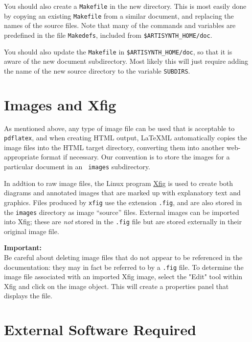 \documentclass{article}
\begin{document}
You should also create a {\tt Makefile} in the new directory. This is most
easily done by copying an existing {\tt Makefile} from a similar document,
and replacing the names of the source files. 
Note that many of the commands
and variables are predefined in the file {\tt Makedefs}, included from
{\tt \$ARTISYNTH\_HOME/doc}.

You should also update the {\tt Makefile} in {\tt \$ARTISYNTH\_HOME/doc},
so that it is aware of the new document subdirectory. Most
likely this will just require adding the name of the new source
directory to the variable {\tt SUBDIRS}.

\section{Images and Xfig}
\label{ImagesSec}

As mentioned above, any type of image file can be used that is
acceptable to {\tt pdflatex}, and when creating HTML output, LaTeXML
automatically copies the image files into the HTML target directory,
converting them into another web-appropriate format if necessary.  Our
convention is to store the images for a particular document in an {\tt
images} subdirectory.

In addtion to raw image files, the Linux program
\href{http://www.xfig.org}{Xfig} is used to create both diagrams and
annotated images that are marked up with explanatory text and
graphics.  Files produced by {\tt xfig} use the extension {\tt .fig},
and are also stored in the {\tt images} directory as image ``source''
files.  External images can be imported into Xfig; these are {\it not}
stored in the {\tt .fig} file but are stored externally in their
original image file.

\begin{sideblock}
{\bf Important:}\\ Be careful about deleting image files that do not
appear to be referenced in the documentation: they may in fact be
referred to by a {\tt .fig} file.  To determine the image file
associated with an imported Xfig image, select the "Edit" tool within
Xfig and click on the image object.  This will create a properties
panel that displays the file.
\end{sideblock}

\section{External Software Required}
\label{ExternalSoftwareSec}
\end{document}
